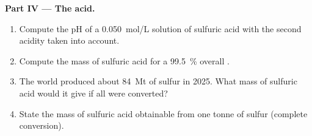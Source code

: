 \begin{problem}
\medskip
\noindent\textbf{Part IV --- The acid.}
\begin{enumerate}[resume]
  \item Compute the pH of a \qty{0.050}{mol/L} solution of sulfuric acid
        with the second acidity taken into account.
  \item Compute the mass of sulfuric acid for a \qty{99.5}{\percent}
        overall .
  \item The world produced about \qty{84}{Mt} of sulfur in 2025. What
        mass of sulfuric acid would it give if all were converted?
  \item State the mass of sulfuric acid obtainable from one tonne of
        sulfur (complete conversion).
\end{enumerate}
\end{problem}
